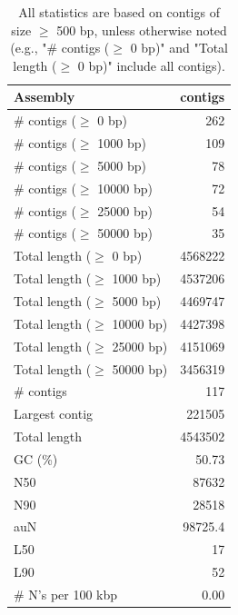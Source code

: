 \documentclass[12pt,a4paper]{article}
\begin{document}
\begin{table}[ht]
\begin{center}
\caption{All statistics are based on contigs of size $\geq$ 500 bp, unless otherwise noted (e.g., "\# contigs ($\geq$ 0 bp)" and "Total length ($\geq$ 0 bp)" include all contigs).}
\begin{tabular}{|l*{1}{|r}|}
\hline
Assembly & contigs \\ \hline
\# contigs ($\geq$ 0 bp) & 262 \\ \hline
\# contigs ($\geq$ 1000 bp) & 109 \\ \hline
\# contigs ($\geq$ 5000 bp) & 78 \\ \hline
\# contigs ($\geq$ 10000 bp) & 72 \\ \hline
\# contigs ($\geq$ 25000 bp) & 54 \\ \hline
\# contigs ($\geq$ 50000 bp) & 35 \\ \hline
Total length ($\geq$ 0 bp) & 4568222 \\ \hline
Total length ($\geq$ 1000 bp) & 4537206 \\ \hline
Total length ($\geq$ 5000 bp) & 4469747 \\ \hline
Total length ($\geq$ 10000 bp) & 4427398 \\ \hline
Total length ($\geq$ 25000 bp) & 4151069 \\ \hline
Total length ($\geq$ 50000 bp) & 3456319 \\ \hline
\# contigs & 117 \\ \hline
Largest contig & 221505 \\ \hline
Total length & 4543502 \\ \hline
GC (\%) & 50.73 \\ \hline
N50 & 87632 \\ \hline
N90 & 28518 \\ \hline
auN & 98725.4 \\ \hline
L50 & 17 \\ \hline
L90 & 52 \\ \hline
\# N's per 100 kbp & 0.00 \\ \hline
\end{tabular}
\end{center}
\end{table}
\end{document}
